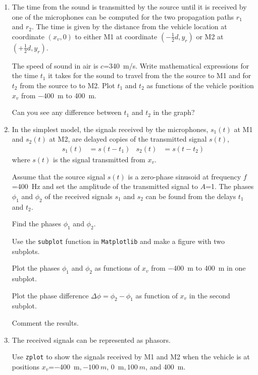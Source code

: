 \begin{enumerate}[1)]
\item The time from the sound is transmitted by the source until it is received by one of the microphones can be computed for the two  propagation paths $r_1$ and $r_2$. 
	The time is given by the distance from the vehicle location at coordinate $(x_v,0)$ to either M1 at coordinate $(-\tfrac12 d, y_r)$ or M2 at $(+\tfrac12 d, y_r)$. 
	
	The speed of sound in air is $c$=\qty{340}{m/s}. 
	Write mathematical expressions for the time $t_1$ it takes for the sound to travel from the the source to M1 and for $t_2$ from the source to to M2. 
	Plot $t_1$ and $t_2$ as functions of the vehicle position $x_v$ from \qty{-400}{m} to \qty{+400}{m}.
	
	Can you see any difference between $t_1$ and $t_2$ in the graph?
	

\item In the simplest model, the signals received by the microphones, $s_1(t)$ at M1 and $s_2(t)$ at M2, are delayed copies of the transmitted signal $s(t)$,
	\begin{align}
		s_1(t)&= s(t-t_1)  &	s_2(t)&= s(t-t_2)  
	\end{align}
	where $s(t)$ is the signal transmitted from $x_v$.
	
	Assume that the source signal $s(t)$ is a zero-phase sinusoid at frequency $f$=\qty{400}{Hz} and set the amplitude of the transmitted signal to $A$=\num{1}. 	
	The phases $\phi_1$ and $\phi_2$ of the received signals $s_1$ and $s_2$ can be found from the delays $t_1$ and $t_2$. 
	
	Find the  phases $\phi_1$ and $\phi_2$. 
	
	Use the \verb|subplot| function in \verb|Matplotlib| and make a figure with two subplots. 
	
	Plot the phases $\phi_1$ and $\phi_2$ as functions of $x_v$ from \qty{-400}{m} to \qty{400}{m} in one subplot.
	
	Plot the phase difference $\Delta \phi = \phi_2 - \phi_1$ as function of $x_v$ in the second subplot.
	
	Comment the results.
	
\item The received signals can be represented as phasors. 
	
	Use \verb|zplot| to show the signals received by M1 and M2 when the vehicle is at positions $x_v$=\qty{-400}{m}$, \qty{-100}{m}$, \qty{0}{m}$, \qty{100}{m}$, and \qty{400}{m}.
	

\end{enumerate}
